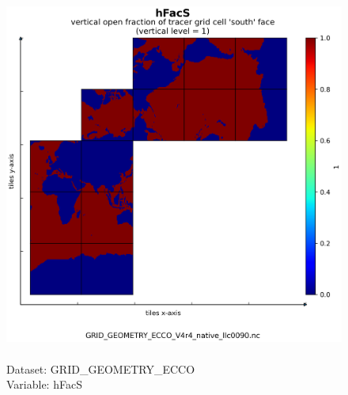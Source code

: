 \begin{figure}[H]
\centering
\includegraphics[scale=0.5]{../images/plots/native_plots_coords/Geometry_Parameters_for_the_Lat-Lon-Cap_90_(llc90)_Native_Model_Grid_(Version_4_Release_4)/hFacS.png}
\caption{\\Dataset: GRID\_GEOMETRY\_ECCO\\Variable: hFacS}
\label{tab:table-GRID_GEOMETRY_ECCO_hFacS-Plot}
\end{figure}
\pagebreak
